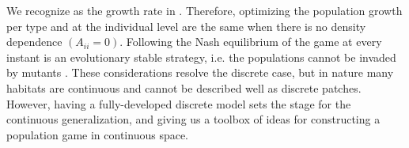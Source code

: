 
We recognize  as the growth rate in . Therefore, optimizing the population growth per type and at the individual level are the same when there is no density dependence $(A_{ii}=0)$. Following the Nash equilibrium of the game  at every instant is an evolutionary stable strategy, i.e. the populations cannot be invaded by mutants \citep{kvrivan2009evolutionary}. These considerations resolve the discrete case, but in nature many habitats are continuous and cannot be described well as discrete patches. However, having a fully-developed discrete model sets the stage for the continuous generalization, and giving us a toolbox of ideas for constructing a population game in continuous space.

